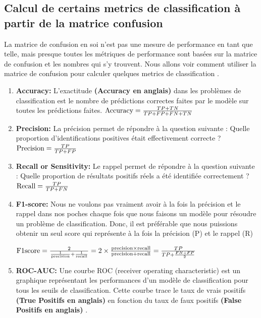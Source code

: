 \documentclass[12pt, french]{report}
\begin{document}
\subsection{Calcul de certains metrics de classification à partir de la matrice confusion}

La matrice de confusion en soi n'est pas une mesure de performance en tant que telle, mais presque toutes les métriques de performance sont basées sur la matrice de confusion et les nombres qui s'y trouvent. Nous allons voir comment utiliser la matrice de confusion pour calculer quelques metrics de classification \cite{key17}.

\begin{enumerate}
\item \textbf{Accuracy:}
L'exactitude \textbf{(Accuracy en anglais)} dans les problèmes de classification est le nombre de prédictions correctes faites par le modèle sur toutes les prédictions faites.
$\textnormal{Accuracy} = \frac{TP+TN}{TP+ FP + FN + TN} $

\item  \textbf{Precision:} 
La précision permet de répondre à la question suivante : Quelle proportion d'identifications positives était effectivement correcte ?
$\textnormal{Precision} = \frac{TP}{TP+ FP} $

\item \textbf{Recall or Sensitivity:}
Le rappel permet de répondre à la question suivante : Quelle proportion de résultats positifs réels a été identifiée correctement ?
$\textnormal{Recall} = \frac{TP}{TP+ FN} $
 
 \item \textbf{F1-score:}
 Nous ne voulons pas vraiment avoir à la fois la précision et le rappel dans nos poches chaque fois que nous faisons un modèle pour résoudre un problème de classification. Donc, il est préférable que nous puissions obtenir un seul score qui représente à la fois la précision (P) et le rappel (R)
 
 $ \textnormal{F1score} = \frac{ 2 }{\frac {1}{\textnormal{precision}} +  \frac {1}{\textnormal{recall}}  } = 2 \times \frac{\textnormal{precision} \times \textnormal{recall}} { \textnormal{precision} + \textnormal{recall} } = \frac{TP} {TP + \frac{FN+FP} {2} } $
 
 \item \textbf{ROC-AUC:}
Une courbe ROC (receiver operating characteristic) est un graphique représentant les performances d'un modèle de classification pour tous les seuils de classification. Cette courbe trace le taux de vrais positifs \textbf{(True Positifs en anglais)} en fonction du taux de faux positifs \textbf{(False Positifs en anglais)} \cite{key18}.
\end{enumerate}
\end{document}
